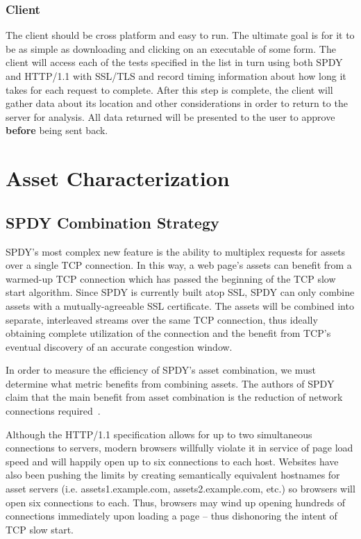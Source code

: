 \documentclass[11pt,letterpaper,notitlepage]{article}
\begin{document}
\subsubsection{Client}
\label{sec:research/client}
The client should be cross platform and easy to run.  The ultimate goal is for
it to be as simple as downloading and clicking on an executable of some form.
The client will access each of the tests specified in the list in turn using
both SPDY and HTTP/1.1 with SSL/TLS and
record timing information about how long it takes for each request to complete.
After this step is complete, the client will gather data about its location and
other considerations in order to return to the server for analysis.  All data
returned will be presented to the user to approve \textbf{before} being sent
back.

\section{Asset Characterization}
\label{sec:assets}
\subsection{SPDY Combination Strategy}
SPDY's most complex new feature is the ability to multiplex requests for assets
over a single TCP connection. In this way, a web page's assets can benefit from
a warmed-up TCP connection which has passed the beginning of the TCP slow start
algorithm. Since SPDY is currently built atop SSL, SPDY can only combine assets
with a mutually-agreeable SSL certificate. The assets will be combined into
separate, interleaved streams over the same TCP connection, thus ideally
obtaining complete utilization of the connection and the benefit from TCP's
eventual discovery of an accurate congestion window.

In order to measure the efficiency of SPDY's asset combination, we must
determine what metric benefits from combining assets. The authors of SPDY claim
that the main benefit from asset combination is the reduction of network
connections required~\cite{spdy-whitepaper}.

Although the HTTP/1.1 specification allows for up to two simultaneous
connections to servers, modern browsers willfully violate it in service of page
load speed and will happily open up to six connections to each host. Websites
have also been pushing the limits by creating semantically equivalent hostnames
for asset servers (i.e. assets1.example.com, assets2.example.com, etc.) so
browsers will open six connections to each. Thus, browsers may wind up opening
hundreds of connections immediately upon loading a page -- thus dishonoring the
intent of TCP slow start.
\end{document}
